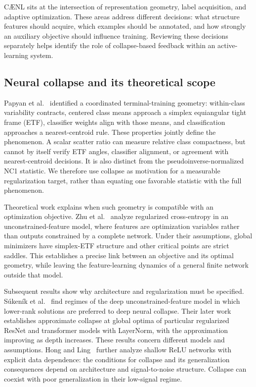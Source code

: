 \documentclass[10pt,a4paper,twocolumn]{article}
\newcommand{\model}{C\AE{}NL}
\begin{document}
\model{} sits at the intersection of representation geometry, label
acquisition, and adaptive optimization. These areas address different
decisions: what structure features should acquire, which examples should
be annotated, and how strongly an auxiliary objective should influence
training. Reviewing these decisions separately helps identify the role
of collapse-based feedback within an active-learning system.

\subsection{Neural collapse and its theoretical scope}
\label{sec:related_collapse}

Papyan et al.~\cite{papyan2020prevalence} identified a coordinated
terminal-training geometry: within-class variability contracts, centered
class means approach a simplex equiangular tight frame (ETF), classifier
weights align with those means, and classification approaches a
nearest-centroid rule. These properties jointly define the phenomenon. A scalar scatter ratio
can measure relative class compactness, but cannot by itself verify ETF
angles, classifier alignment, or agreement with nearest-centroid
decisions. It is also distinct from the pseudoinverse-normalized NC1
statistic. We therefore use collapse as motivation for a measurable
regularization target, rather than equating one favorable statistic
with the full phenomenon.

Theoretical work explains when such geometry is compatible with an
optimization objective. Zhu et al.~\cite{zhu2021geometric} analyze
regularized cross-entropy in an unconstrained-feature model, where
features are optimization variables rather than outputs constrained by
a complete network. Under their assumptions, global minimizers have
simplex-ETF structure and other critical points are strict saddles.
This establishes a precise link between an objective and its optimal
geometry, while leaving the feature-learning dynamics of a general
finite network outside that model.

Subsequent results show why architecture and regularization must be
specified. S\'{u}ken\'{i}k et al.~\cite{sukenik2024lowrank} find regimes
of the deep unconstrained-feature model in which lower-rank solutions
are preferred to deep neural collapse. Their later
work~\cite{sukenik2025resnets} establishes approximate collapse at global
optima of particular regularized ResNet and transformer models with
LayerNorm, with the approximation improving as depth increases.
These results concern different models and assumptions. Hong and
Ling~\cite{hong2026shallow} further analyze shallow ReLU networks with
explicit data dependence: the conditions for collapse and its
generalization consequences depend on architecture and signal-to-noise
structure. Collapse can coexist with poor generalization in their
low-signal regime.
\end{document}
